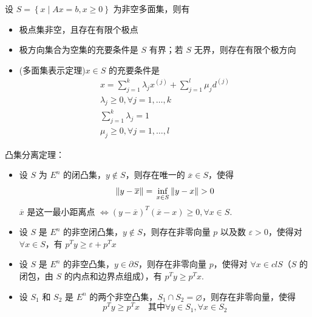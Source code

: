\begin{remark}
    设 $S = \left\{x \mid Ax = b, x \ge 0\right\}$ 为非空多面集，则有
    \begin{itemize}
        \item 极点集非空，且存在有限个极点
        \item 极方向集合为空集的充要条件是 $S$ 有界；若 $S$ 无界，则存在有限个极方向
        \item (多面集表示定理)$x \in S$ 的充要条件是 \begin{gather*}
            x = \sum_{j = 1}^k \lambda_j x^{(j)} + \sum_{j = 1}^l \mu_j d^{(j)}\\
            \lambda_j \ge 0, \forall j = 1, \dots, k\\
            \sum_{j = 1}^k \lambda_j = 1\\
            \mu_j \ge 0, \forall j = 1, \dots, l
        \end{gather*}
    \end{itemize}
\end{remark}

\begin{remark}
    凸集分离定理：
    \begin{itemize}
        \item 设 $S$ 为 $E^n$ 的闭凸集，$y\notin S$，则存在唯一的 $\overline{x} \in S$，使得\[ \|y - \overline{x}\| = \sideset{}{}{\operatorname{inf}}_{x \in S}\|y - x\| > 0 \]
        $\overline{x}$ 是这一最小距离点 $\Leftrightarrow (y - \overline{x})^T(\overline{x} - x) \ge 0, \forall x \in S$.

        \item 设 $S$ 是 $E^n$ 的非空闭凸集，$y\notin S$，则存在非零向量 $p$ 以及数 $\varepsilon > 0$，使得对 $\forall x \in S$，有 $p^T y \ge \varepsilon + p^T x$
        
        \item 设 $S$ 是 $E^n$ 的非空凸集，$y\in \partial S$，则存在非零向量 $p$，使得对 $\forall x \in clS$（$S$ 的闭包，由 $S$ 的内点和边界点组成），有 $p^Ty \ge p^Tx$.
        
        \item 设 $S_1$ 和 $S_2$ 是 $E^n$ 的两个非空凸集，$S_1 \cap S_2 = \varnothing$，则存在非零向量，使得\[p^Ty \ge p^T x \quad \text{其中}\forall y \in S_1, \forall x \in S_2\]
    \end{itemize}
\end{remark}

